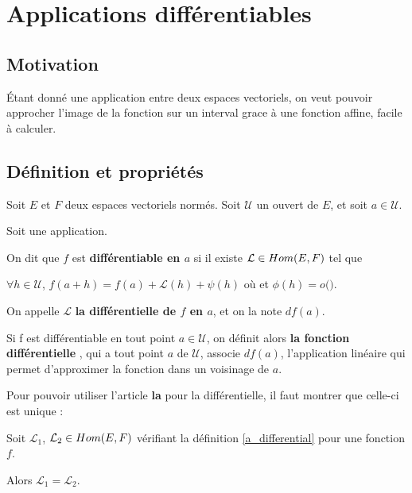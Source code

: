 \chapter{Applications différentiables}

\section{Motivation}
	Étant donné une application entre deux espaces vectoriels, on veut pouvoir
	approcher l'image de la fonction sur un interval grace à une fonction
	affine, facile à calculer.


\section{Définition et propriétés}

\begin{definition} 
	Soit $E$ et $F$ deux espaces vectoriels normés.
	Soit $\mathcal{U}$ un ouvert de $E$, et soit $a \in \mathcal{U}$.

	Soit  une application.

	On dit que $f$ est \textbf{différentiable en $a$} si il existe $\mathcal{L}
	\in Hom(E, F)$ tel que
	
	$\forall h \in \mathcal{U}$,
	$f(a + h) = f(a) + \mathcal{L}(h) + \psi(h)$ où
	et $\phi(h) = o($$)$.

	\label{a_differential}
\end{definition}

On appelle $\mathcal{L}$ \textbf{la différentielle de $f$ en $a$}, et on la note
$df(a)$.

Si f est différentiable en tout point $a \in \mathcal{U}$, on définit alors
\textbf{la fonction différentielle}
, qui a tout point $a$
de $\mathcal{U}$, associe $df(a)$, l'application linéaire qui permet
d'approximer la fonction dans un voisinage de $a$.

Pour pouvoir utiliser l'article \textbf{la} pour la différentielle, il faut
montrer que celle-ci est unique :

\begin{proposition}
	Soit $\mathcal{L}_{1}$, $\mathcal{L}_{2} \in Hom(E, F)$
	vérifiant la définition \ref{a_differential} pour une fonction $f$.

	Alors $\mathcal{L}_{1} = \mathcal{L}_{2}$.
\end{proposition}

